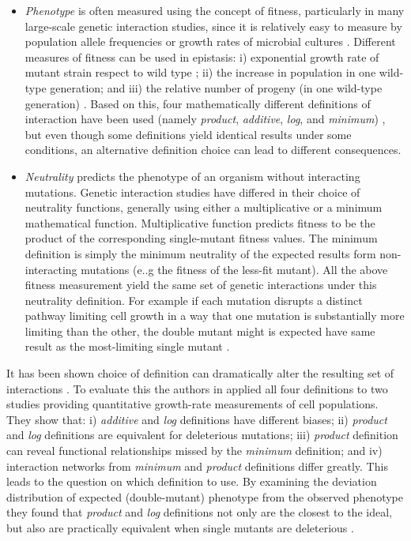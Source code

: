 \begin{itemize}
	\item \textit{Phenotype} is often measured using the concept of fitness, particularly in many large-scale genetic interaction studies, since it is relatively easy to measure by population allele frequencies or growth rates of microbial cultures \cite{mani2008defining}. 
Different measures of fitness can be used in epistasis: i) exponential growth rate of mutant strain respect to wild type ; ii) the increase in population in one wild-type generation; and iii) the relative number of progeny (in one wild-type generation) \cite{mani2008defining}.
Based on this, four mathematically different definitions of interaction have been used (namely \textit{product}, \textit{additive}, \textit{log}, and \textit{minimum}) \cite{mani2008defining}, but even though some definitions yield identical results under some conditions, an alternative definition choice can lead to different consequences\cite{mani2008defining}.

	\item \textit{Neutrality} predicts the phenotype of an organism without interacting mutations. 
Genetic interaction studies have differed in their choice of neutrality functions, generally using either a multiplicative or a minimum mathematical function. Multiplicative function predicts fitness to be the product of the corresponding single-mutant fitness values. 
	The minimum definition is simply the minimum neutrality of the expected results form non-interacting mutations (e..g the fitness of the less-fit mutant). 
All the above fitness measurement yield the same set of genetic interactions under this neutrality definition. 
For example if each mutation disrupts a distinct pathway limiting cell growth in a way that one mutation is substantially more limiting than the other, the double mutant might is expected have same result as the most-limiting single mutant \cite{mani2008defining}.
\end{itemize}

It has been shown choice of definition can dramatically alter the resulting set of interactions \cite{mani2008defining}.
To evaluate this the authors in \cite{mani2008defining} applied all four definitions to two studies providing quantitative growth-rate measurements of cell populations. 
They show that: 
i) \textit{additive} and \textit{log} definitions have different biases; 
ii) \textit{product} and \textit{log} definitions are equivalent for deleterious mutations; 
iii) \textit{product} definition can reveal functional relationships missed by the \textit{minimum} definition; 
and iv) interaction networks from \textit{minimum} and \textit{product} definitions differ greatly. 
This leads to the question on which definition to use. 
By examining the deviation distribution of expected (double-mutant) phenotype from the observed phenotype they found that \textit{product} and \textit{log} definitions not only are the closest to the ideal, but also are practically equivalent when single mutants are deleterious \cite{mani2008defining}.

